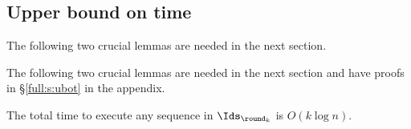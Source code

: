 \subsection{Upper bound on time} 

\begin{fullonly}
The following two crucial lemmas are needed in the next section.
\end{fullonly}
\begin{shortonly}
The following two crucial lemmas are needed in the next section and have proofs in \S\ref{full:s:ubot} in the appendix. 
\end{shortonly}
\begin{lemma}
The total time to execute any sequence in $\Ids_{\round_k}$ is $O(k \log n)$.
\end{lemma}



